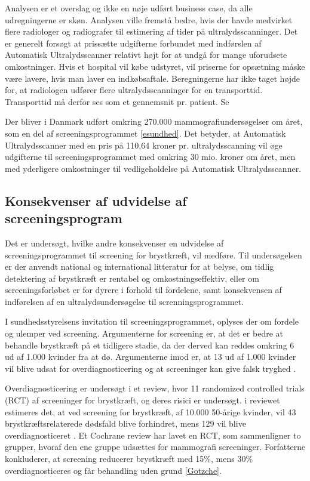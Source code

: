 Analysen er et overslag og ikke en nøje udført business case, da alle udregningerne er skøn. Analysen ville fremstå bedre, hvis der havde medvirket flere radiologer og radiografer til estimering af tider på ultralydsscanninger. Det er generelt forsøgt at prissætte udgifterne forbundet med indførslen af Automatisk Ultralydsscanner relativt højt for at undgå for mange uforudsete omkostninger. Hvis et hospital vil købe udstyret, vil priserne for opsætning måske være lavere, hvis man laver en indkøbsaftale. Beregningerne har ikke taget højde for, at radiologen udfører flere ultralydsscanninger for en transporttid. Transporttid må derfor ses som et gennemsnit pr. patient. Se 

Der bliver i Danmark udført omkring 270.000 mammografiundersøgelser om året, som en del af screeningsprogrammet \ref{esundhed}. Det betyder, at Automatisk Ultralydsscanner med en pris på 110,64 kroner pr. ultralydsscanning vil øge udgifterne til screeningsprogrammet med omkring 30 mio. kroner om året, men med yderligere omkostninger til vedligeholdelse på Automatisk Ultralydsscanner. 

\subsection{Konsekvenser af udvidelse af screeningsprogram} 
Det er undersøgt, hvilke andre konsekvenser en udvidelse af screeningsprogrammet til screening for brystkræft, vil medføre. Til undersøgelsen er der anvendt national og international litteratur for at belyse, om tidlig detektering af brystkræft er rentabel og omkostningseffektiv, eller om screeningsforløbet er for dyrere i forhold til fordelene, samt konsekvensen af indførelsen af en ultralydsundersøgelse til screnningsprogrammet. 

I sundhedsstyrelsens invitation til screeningsprogrammet, oplyses der om fordele og ulemper ved screening. Argumenterne for screening er, at det er bedre at behandle brystkræft på et tidligere stadie, da der derved kan reddes omkring 6 ud af 1.000 kvinder fra at dø. Argumenterne imod er, at 13 ud af 1.000 kvinder vil blive udsat for overdiagnosticering og at screeninger kan give falsk tryghed \cite{Argumenter}.

Overdiagnosticering er undersøgt i et review, hvor 11 randomized controlled trials (RCT) af screeninger for brystkræft, og deres risici er undersøgt. i reviewet estimeres det, at ved screening for brystkræft, af 10.000 50-årige kvinder, vil 43 brystkræftsrelaterede dødsfald blive forhindret, mens 129 vil blive overdiagnosticeret \cite{Panel}. Et Cochrane review har lavet en RCT, som sammenligner to grupper, hvoraf den ene gruppe udsættes for mammografi screeninger. Forfatterne konkluderer, at screening reducerer brystkræft med 15\%, mens 30\% overdiagnosticeres og får behandling uden grund \ref{Gotzche}. 

